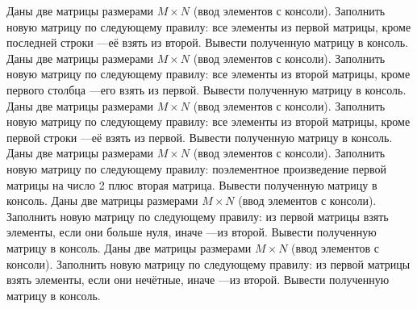 Даны две матрицы размерами $M \times N$ (ввод элементов с консоли). Заполнить новую матрицу по следующему правилу: все элементы из первой матрицы, кроме последней строки ---её взять из второй. Вывести полученную матрицу в консоль.
Даны две матрицы размерами $M \times N$ (ввод элементов с консоли). Заполнить новую матрицу по следующему правилу: все элементы из второй матрицы, кроме первого столбца ---его взять из первой. Вывести полученную матрицу в консоль.
Даны две матрицы размерами $M \times N$ (ввод элементов с консоли). Заполнить новую матрицу по следующему правилу: все элементы из второй матрицы, кроме первой строки ---её взять из первой. Вывести полученную матрицу в консоль.
Даны две матрицы размерами $M \times N$ (ввод элементов с консоли). Заполнить новую матрицу по следующему правилу: поэлементное произведение первой матрицы на число 2 плюс вторая матрица. Вывести полученную матрицу в консоль.
Даны две матрицы размерами $M \times N$ (ввод элементов с консоли). Заполнить новую матрицу по следующему правилу: из первой матрицы взять элементы, если они больше нуля, иначе ---из второй. Вывести полученную матрицу в консоль.
Даны две матрицы размерами $M \times N$ (ввод элементов с консоли). Заполнить новую матрицу по следующему правилу: из первой матрицы взять элементы, если они нечётные, иначе ---из второй. Вывести полученную матрицу в консоль.
